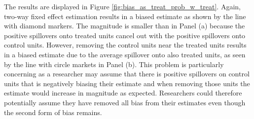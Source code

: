 \documentclass[11pt]{article}
\begin{document}
The results are displayed in Figure \ref{fig:bias_as_treat_prob_w_treat}. Again, two-way fixed effect estimation results in a biased estimate as shown by the line with diamond markers. The magnitude is smaller than in Panel (a) because the positive spillovers onto treated units cancel out with the positive spillovers onto control units. However, removing the control units near the treated units results in a biased estimate due to the average spillover onto also treated units, as seen by the line with circle markets in Panel (b). This problem is particularly concerning as a researcher may assume that there is positive spillovers on control units that is negatively biasing their estimate and when removing those units the estimate would increase in magnitude as expected. Researchers could therefore potentially assume they have removed all bias from their estimates even though the second form of bias remains. 
\end{document}
